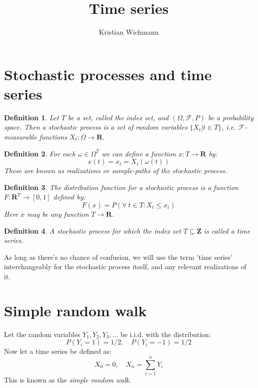 \documentclass[12pt, a4paper]{article}
\title{Time series}
\author{Kristian Wichmann}
\newtheorem{definition}{Definition}[section]
\numberwithin{equation}{section}
\begin{document}
\maketitle

\section{Stochastic processes and time series}
\begin{definition}
Let $T$ be a set, called the index set, and $(\Omega, \mathcal{F}, P)$ be a probability space. Then a stochastic process is a set of random variables $\{X_t|t\in T\}$, i.e. $\mathcal{F}$-measurable functions $X_t: \Omega\rightarrow\mathbf{R}$.
\end{definition}

\begin{definition}
For each $\omega\in\Omega^T$ we can define a function $x:T\rightarrow\mathbf{R}$ by:
\begin{equation}
x(t)=x_t=X_t(\omega(t))
\end{equation}
These are known as realizations or sample-paths of the stochastic process.
\end{definition}

\begin{definition}
The distribution function for a stochastic process is a function $F:\mathbf{R}^T\rightarrow [0,1]$ defined by:
\begin{equation}
F(x)=P(\forall\ t\in T: X_t\le x_t)
\end{equation}
Here $x$ may be any function $T\rightarrow\mathbf{R}$.
\end{definition}

\begin{definition}
A stochastic process for which the index set $T\subseteq\mathbf{Z}$ is called a time series.
\end{definition}
As long as there's no chance of confusion, we will use the term 'time series' interchangeably for the stochastic process itself, and any relevant realizations of it.

\section{Simple random walk}
Let the random variables $Y_1, Y_2, Y_3,\ldots$ be i.i.d. with the distribution:
\begin{equation}
P(Y_i=1)=1/2,\quad P(Y_i=-1)=1/2
\end{equation}
Now let a time series be defined as:
\begin{equation}
X_0=0,\quad X_n=\sum_{i=1}^n Y_i
\end{equation}
This is known as the \textit{simple random walk}.
\end{document}
